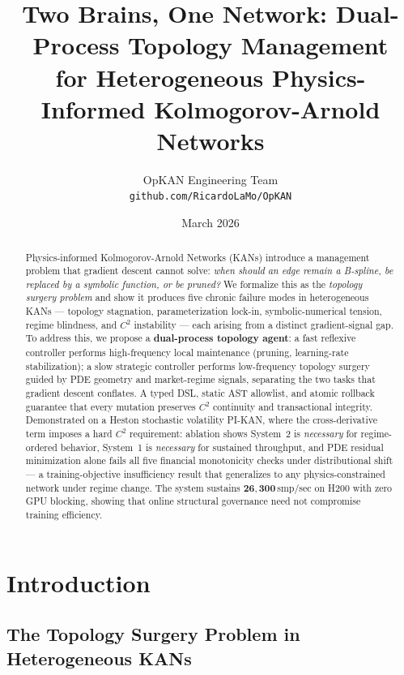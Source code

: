 \documentclass[11pt,a4paper]{article}
\title{\textbf{Two Brains, One Network: Dual-Process Topology Management\\for Heterogeneous Physics-Informed Kolmogorov-Arnold Networks}}
\author{OpKAN Engineering Team \\ \texttt{github.com/RicardoLaMo/OpKAN}}
\date{March 2026}
\begin{document}
\maketitle

\begin{abstract}
Physics-informed Kolmogorov-Arnold Networks (KANs) introduce a management problem that
gradient descent cannot solve: \emph{when should an edge remain a B-spline, be replaced
by a symbolic function, or be pruned?} We formalize this as the \emph{topology surgery
problem} and show it produces five chronic failure modes in heterogeneous KANs ---
topology stagnation, parameterization lock-in, symbolic-numerical tension, regime
blindness, and $C^2$ instability --- each arising from a distinct gradient-signal gap.
To address this, we propose a \textbf{dual-process topology agent}: a fast reflexive
controller performs high-frequency local maintenance (pruning, learning-rate
stabilization); a slow strategic controller performs low-frequency topology surgery
guided by PDE geometry and market-regime signals, separating the two tasks that
gradient descent conflates. A typed DSL, static AST allowlist, and atomic rollback
guarantee that every mutation preserves $C^2$ continuity and transactional integrity.
Demonstrated on a Heston stochastic volatility PI-KAN, where the cross-derivative
term imposes a hard $C^2$ requirement: ablation shows System~2 is \emph{necessary}
for regime-ordered behavior, System~1 is \emph{necessary} for sustained throughput,
and PDE residual minimization alone fails all five financial monotonicity checks under
distributional shift --- a training-objective insufficiency result that generalizes to
any physics-constrained network under regime change. The system sustains
$\mathbf{26{,}300}$\,smp/sec on H200 with zero GPU blocking, showing that online
structural governance need not compromise training efficiency.
\end{abstract}

\section{Introduction}
\label{sec:intro}

\subsection{The Topology Surgery Problem in Heterogeneous KANs}
\label{sec:intro:surgery}
\end{document}
